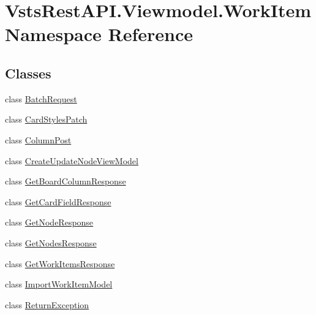 \hypertarget{namespace_vsts_rest_a_p_i_1_1_viewmodel_1_1_work_item}{}\section{Vsts\+Rest\+A\+P\+I.\+Viewmodel.\+Work\+Item Namespace Reference}
\label{namespace_vsts_rest_a_p_i_1_1_viewmodel_1_1_work_item}
\subsection*{Classes}
\begin{DoxyCompactItemize}
\item 
class \mbox{\hyperlink{class_vsts_rest_a_p_i_1_1_viewmodel_1_1_work_item_1_1_batch_request}{Batch\+Request}}
\item 
class \mbox{\hyperlink{class_vsts_rest_a_p_i_1_1_viewmodel_1_1_work_item_1_1_card_styles_patch}{Card\+Styles\+Patch}}
\item 
class \mbox{\hyperlink{class_vsts_rest_a_p_i_1_1_viewmodel_1_1_work_item_1_1_column_post}{Column\+Post}}
\item 
class \mbox{\hyperlink{class_vsts_rest_a_p_i_1_1_viewmodel_1_1_work_item_1_1_create_update_node_view_model}{Create\+Update\+Node\+View\+Model}}
\item 
class \mbox{\hyperlink{class_vsts_rest_a_p_i_1_1_viewmodel_1_1_work_item_1_1_get_board_column_response}{Get\+Board\+Column\+Response}}
\item 
class \mbox{\hyperlink{class_vsts_rest_a_p_i_1_1_viewmodel_1_1_work_item_1_1_get_card_field_response}{Get\+Card\+Field\+Response}}
\item 
class \mbox{\hyperlink{class_vsts_rest_a_p_i_1_1_viewmodel_1_1_work_item_1_1_get_node_response}{Get\+Node\+Response}}
\item 
class \mbox{\hyperlink{class_vsts_rest_a_p_i_1_1_viewmodel_1_1_work_item_1_1_get_nodes_response}{Get\+Nodes\+Response}}
\item 
class \mbox{\hyperlink{class_vsts_rest_a_p_i_1_1_viewmodel_1_1_work_item_1_1_get_work_items_response}{Get\+Work\+Items\+Response}}
\item 
class \mbox{\hyperlink{class_vsts_rest_a_p_i_1_1_viewmodel_1_1_work_item_1_1_import_work_item_model}{Import\+Work\+Item\+Model}}
\item 
class \mbox{\hyperlink{class_vsts_rest_a_p_i_1_1_viewmodel_1_1_work_item_1_1_return_exception}{Return\+Exception}}
\item 

\end{DoxyCompactItemize}
